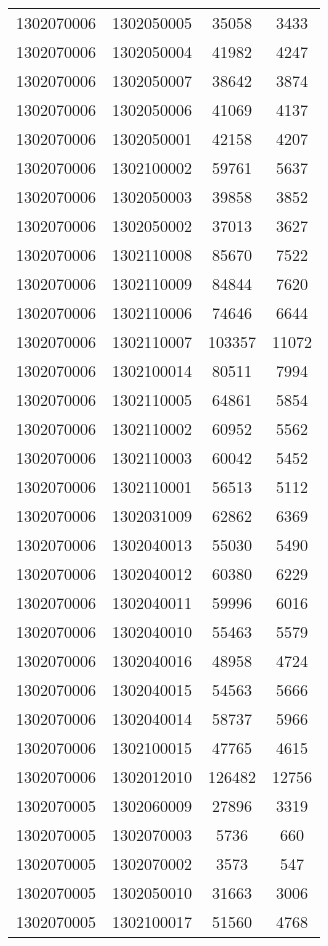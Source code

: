 \begin{longtable}[h]{llcc}
		1302070006 & 1302050005 & 35058 & 3433\\
		1302070006 & 1302050004 & 41982 & 4247\\
		1302070006 & 1302050007 & 38642 & 3874\\
		1302070006 & 1302050006 & 41069 & 4137\\
		1302070006 & 1302050001 & 42158 & 4207\\
		1302070006 & 1302100002 & 59761 & 5637\\
		1302070006 & 1302050003 & 39858 & 3852\\
		1302070006 & 1302050002 & 37013 & 3627\\
		1302070006 & 1302110008 & 85670 & 7522\\
		1302070006 & 1302110009 & 84844 & 7620\\
		1302070006 & 1302110006 & 74646 & 6644\\
		1302070006 & 1302110007 & 103357 & 11072\\
		1302070006 & 1302100014 & 80511 & 7994\\
		1302070006 & 1302110005 & 64861 & 5854\\
		1302070006 & 1302110002 & 60952 & 5562\\
		1302070006 & 1302110003 & 60042 & 5452\\
		1302070006 & 1302110001 & 56513 & 5112\\
		1302070006 & 1302031009 & 62862 & 6369\\
		1302070006 & 1302040013 & 55030 & 5490\\
		1302070006 & 1302040012 & 60380 & 6229\\
		1302070006 & 1302040011 & 59996 & 6016\\
		1302070006 & 1302040010 & 55463 & 5579\\
		1302070006 & 1302040016 & 48958 & 4724\\
		1302070006 & 1302040015 & 54563 & 5666\\
		1302070006 & 1302040014 & 58737 & 5966\\
		1302070006 & 1302100015 & 47765 & 4615\\
		1302070006 & 1302012010 & 126482 & 12756\\
		1302070005 & 1302060009 & 27896 & 3319\\
		1302070005 & 1302070003 & 5736 & 660\\
		1302070005 & 1302070002 & 3573 & 547\\
		1302070005 & 1302050010 & 31663 & 3006\\
		1302070005 & 1302100017 & 51560 & 4768\\

\end{longtable}
